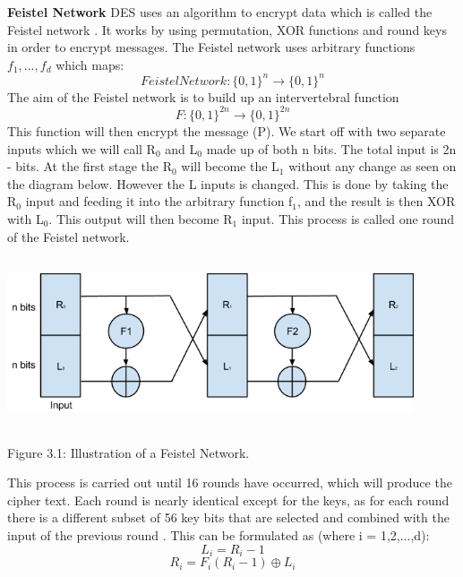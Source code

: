 \documentclass[11pt,a4paper]{report}
\begin{document}
\textbf{Feistel Network}\newline
DES uses an algorithm to encrypt data which is called the Feistel network \cite{DBLP:books/sp/Buchmann02}. It works by using permutation, XOR functions and round keys in order to encrypt messages. The Feistel network uses arbitrary functions $f_{1},...,f_{d}$ which maps:
\begin{displaymath}
FeistelNetwork: \{0,1\}^n \rightarrow \{0,1\}^n
\end{displaymath}
The aim of the Feistel network is to build up an intervertebral function
\begin{displaymath}
F: \{0,1\}^{2n} \rightarrow \{0,1\}^{2n}
\end{displaymath}
This function will then encrypt the message (P). We start off with two separate inputs which we will call R$_{0}$ and L$_{0}$ made up of both n bits. The total input is 2n - bits. At the first stage the R$_{0}$ will become the L$_{1}$ without any change as seen on the diagram below. However the L inputs is changed. This is done by taking the R$_{0}$ input and feeding it into the arbitrary function f$_{1}$, and the result is then XOR with L$_{0}$. This output will then become R$_{1}$ input. This process is called one round of the Feistel network.

\includegraphics[width=12cm, height=5cm]{FeistelNet.png}
\begin{center}
Figure 3.1: Illustration of a Feistel Network.
\end{center}

This process is carried out until 16 rounds have occurred, which will produce the cipher text. Each round is nearly identical except for the keys, as for each round there is a different subset of 56
key bits that are selected and combined with the input of the previous round \cite{Fabio2000LogicalSAT}. 
This can be formulated as (where i = 1,2,...,d):
\begin{displaymath}
L_{i} = R_{i}-1
\end{displaymath}
\begin{displaymath}
R_{i} = F_{i} (R_{i}-1) \oplus L_{i}
\end{displaymath}
\end{document}
